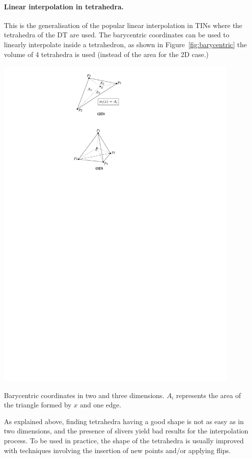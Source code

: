 \paragraph{Linear interpolation in tetrahedra.}
This is the generalisation of the popular linear interpolation in TINs where the tetrahedra of the DT are used. 
The barycentric coordinates can be used to linearly interpolate inside a tetrahedron, as shown in Figure~\ref{fig:barycentric} the volume of 4 tetrahedra is used (instead of the area for the 2D case.)
\begin{marginfigure}
  \centering
  \includegraphics[width=0.9\textwidth]{figs/barycentric}
  \caption{Barycentric coordinates in two and three dimensions. $A_i$ represents the area of the triangle formed by $x$ and one edge.}%
\label{fig:barycentric}
\end{marginfigure}
As explained above, finding tetrahedra having a good shape is not as easy as in two dimensions, and the presence of slivers yield bad results for the interpolation process. 
To be used in practice, the shape of the tetrahedra is usually improved with techniques involving the insertion of new points and/or applying flips.

